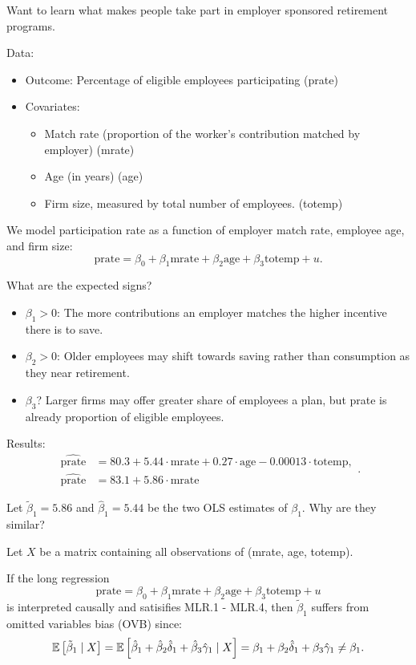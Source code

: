 \begin{example}
	Want to learn what makes people take part in employer sponsored retirement programs.
	
	Data:
	\begin{itemize}
		\item Outcome: Percentage of eligible employees participating (prate)
		\item Covariates:
		\begin{itemize}
			\item Match rate (proportion of the worker's contribution matched by employer) (mrate)
			\item Age (in years) (age)
			\item Firm size, measured by total number of employees. (totemp)
		\end{itemize}
	\end{itemize}
	
	We model participation rate as a function of employer match rate, employee age, and firm size: \[
		\text{prate} = \beta_0 + \beta_1 \text{mrate} + \beta_2 \text{age} + \beta_3 \text{totemp} + u
	.\] 
	
	What are the expected signs?
	\begin{itemize}
		\item $\beta_1 > 0$: The more contributions an employer matches the higher incentive there is to save.
		\item $\beta_2 > 0$: Older employees may shift towards saving rather than consumption as they near retirement.
		\item $\beta_3$? Larger firms may offer greater share of employees a plan, but prate is already proportion of eligible employees.
	\end{itemize}
	
	Results:
	\[
		\begin{aligned}
			\widehat{\text{prate}} &= 80.3 + 5.44 \cdot \text{mrate} + 0.27 \cdot \text{age} - 0.00013 \cdot \text{totemp}, \\
			\widehat{\text{prate}} &= 83.1 + 5.86 \cdot \text{mrate}
		\end{aligned}
	.\]
	
	Let $\tilde{\beta}_1 = 5.86$ and $\hat{\beta}_1 = 5.44$ be the two OLS estimates of $\beta_1$. Why are they similar?
\end{example}

\begin{definition}
	Let $X$ be a matrix containing all observations of (mrate, age, totemp).
	
	If the long regression \[
		\text{prate} = \beta_0 + \beta_1 \text{mrate} + \beta_2 \text{age} + \beta_3 \text{totemp} + u
	\] is interpreted causally and satisifies MLR.1 - MLR.4, then $\tilde{\beta}_1$ suffers from omitted variables bias (OVB) since: \[
		\mathbb{E}\left[\tilde{\beta}_1 \mid X\right] = \mathbb{E}\left[\hat{\beta}_1 + \hat{\beta}_2 \hat{\delta}_1 + \hat{\beta}_3 \hat{\gamma}_1 \mid X\right] = \beta_1 + \beta_2 \hat{\delta}_1 + \beta_3 \hat{\gamma}_1 \ne \beta_1
	.\] 
\end{definition}

